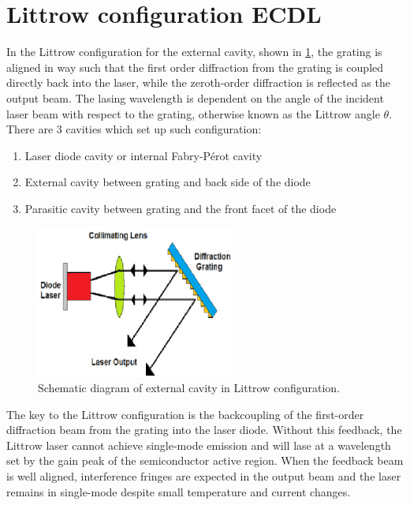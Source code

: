 \section{Littrow configuration ECDL}\label{Littrowsection}
In the Littrow configuration for the external cavity, shown in \cref{littrow2}, the grating is aligned in way such that the first order diffraction from the grating is coupled directly back into the laser, while the zeroth-order diffraction is reflected as the output beam. The lasing wavelength is dependent on the angle of the incident laser beam with respect to the grating, otherwise known as the Littrow angle $\theta$.
There are 3 cavities which set up such configuration:
\begin{enumerate}
\item Laser diode cavity or internal Fabry-P\'{e}rot cavity
\item External cavity between grating and back side of the diode 
\item Parasitic cavity between grating and the front facet of the diode
\end{enumerate}

\begin{figure}[!t]
\centering
\includegraphics[width=0.7\linewidth, height=5cm, draft=\foto]{eps/littrow2.eps}
\caption{Schematic diagram of external cavity in Littrow configuration.}
\label{littrow2}
\end{figure}

The key to the Littrow configuration is the backcoupling of the first-order diffraction beam from the grating into the laser diode. Without this feedback, the Littrow laser cannot achieve single-mode emission and will lase at a wavelength set by the gain peak of the semiconductor active region. When the feedback beam is well aligned, interference fringes are expected in the output beam and the laser remains in single-mode despite small temperature and current changes.




